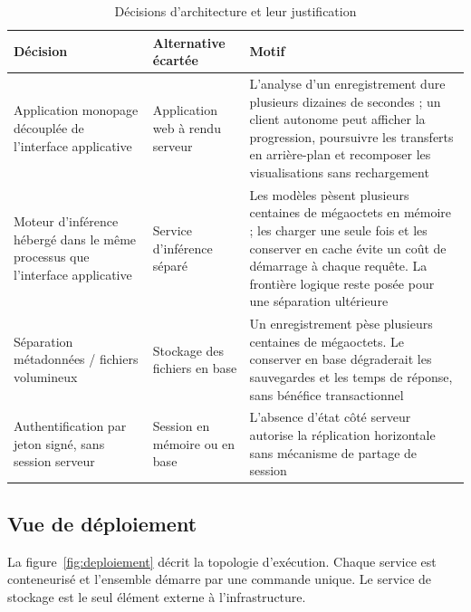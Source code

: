 \begin{table}[H]
\centering
\caption{Décisions d'architecture et leur justification}
\label{tab:choix}
\small
\begin{tabular}{@{}L{3.2cm}L{5.2cm}L{5.6cm}@{}}
\toprule
\textbf{Décision} & \textbf{Alternative écartée} & \textbf{Motif} \\
\midrule
Application monopage découplée de l'interface applicative &
Application web à rendu serveur &
L'analyse d'un enregistrement dure plusieurs dizaines de secondes ; un client
autonome peut afficher la progression, poursuivre les transferts en arrière-plan et
recomposer les visualisations sans rechargement \\
\addlinespace[3pt]
Moteur d'inférence hébergé dans le même processus que l'interface applicative &
Service d'inférence séparé &
Les modèles pèsent plusieurs centaines de mégaoctets en mémoire ; les charger une
seule fois et les conserver en cache évite un coût de démarrage à chaque requête. La
frontière logique reste posée pour une séparation ultérieure \\
\addlinespace[3pt]
Séparation métadonnées / fichiers volumineux &
Stockage des fichiers en base &
Un enregistrement pèse plusieurs centaines de mégaoctets. Le conserver en base
dégraderait les sauvegardes et les temps de réponse, sans bénéfice transactionnel \\
\addlinespace[3pt]
Authentification par jeton signé, sans session serveur &
Session en mémoire ou en base &
L'absence d'état côté serveur autorise la réplication horizontale sans mécanisme de
partage de session \\
\bottomrule
\end{tabular}
\end{table}

\subsection{Vue de déploiement}

La figure~\ref{fig:deploiement} décrit la topologie d'exécution. Chaque service est
conteneurisé et l'ensemble démarre par une commande unique. Le service de stockage
est le seul élément externe à l'infrastructure.

